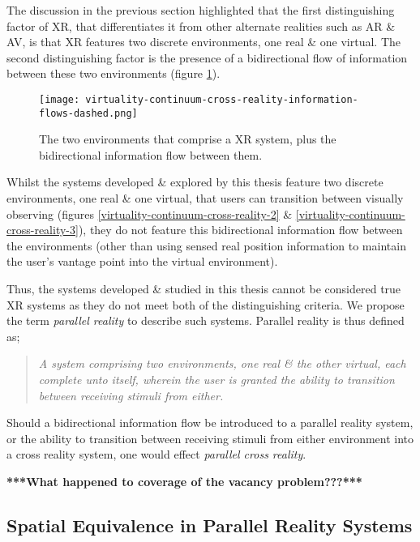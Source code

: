 The discussion in the previous section highlighted that the first distinguishing factor of XR, that differentiates it from other alternate realities such as AR \& AV, is that XR features two discrete environments, one real \& one virtual. The second distinguishing factor is the presence of a bidirectional flow of information between these two environments (figure \ref{virtuality-continuum-cross-reality-information-flows-dashed.png}).

\begin{figure}[h]
	\begin{center}
		\texttt{[image: virtuality-continuum-cross-reality-information-flows-dashed.png]}
		\caption{The two environments that comprise a XR system, plus the bidirectional information flow between them.}
		\label{virtuality-continuum-cross-reality-information-flows-dashed.png}
	\end{center}
\end{figure}

Whilst the systems developed \& explored by this thesis feature two discrete environments, one real \& one virtual, that users can transition between visually observing (figures \ref{virtuality-continuum-cross-reality-2} \& \ref{virtuality-continuum-cross-reality-3}), they do not feature this bidirectional information flow between the environments (other than using sensed real position information to maintain the user's vantage point into the virtual environment).

Thus, the systems developed \& studied in this thesis cannot be considered true XR systems as they do not meet both of the distinguishing criteria. We propose the term \textit{parallel reality} to describe such systems. Parallel reality is thus defined as;

\begin{quote}
	\textit{A system comprising two environments, one real \& the other virtual, each complete unto itself, wherein the user is granted the ability to transition between receiving stimuli from either.}
\end{quote}

Should a bidirectional information flow be introduced to a parallel reality system, or the ability to transition between receiving stimuli from either environment into a cross reality system, one would effect \textit{parallel cross reality}.

\textbf{***What happened to coverage of the vacancy problem???***}

\subsection{Spatial Equivalence in Parallel Reality Systems}

